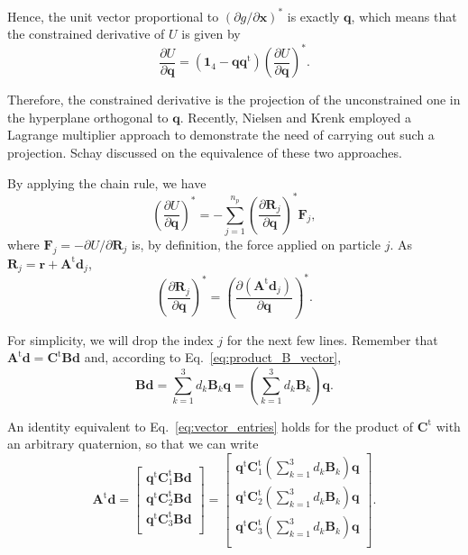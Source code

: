 \documentclass[aip,jcp,reprint,amsmath,amssymb]{revtex4-1}
\newcommand{\mt}[1]{\boldsymbol{\mathbf{#1}}}           %
\newcommand{\vt}[1]{\boldsymbol{\mathbf{#1}}}           %
\newcommand{\tr}[1]{#1^\text{t}}                               %
\newcommand{\diff}[2]{\dfrac{\partial #1}{\partial #2}} %
\begin{document}
Hence, the unit vector proportional to $(\partial g/\partial \vt x)^\ast$ is exactly $\vt q$, which means that the constrained derivative of $U$ is given by
\begin{equation}
\label{eq:diff_projection}
\diff{U}{\vt q} = (\mt 1_4 - {\vt q}\tr{\vt q})\left( \diff{U}{\vt q} \right)^\ast.
\end{equation}

Therefore, the constrained derivative is the projection of the unconstrained one in the hyperplane orthogonal to $\vt q$. Recently, Nielsen and Krenk\cite{Nielsen2012} employed a Lagrange multiplier approach to demonstrate the need of carrying out such a projection. Schay\cite{Schay1995, Schay1998} discussed on the equivalence of these two approaches.

By applying the chain rule, we have
\[
\left( \diff{U}{\vt q} \right)^\ast = - \sum_{j=1}^{n_p} \left( \diff{\vt R_j}{\vt q} \right)^\ast {\vt F_j},
\]
where $\vt F_j = -\partial U/\partial \vt R_j$ is, by definition, the force applied on particle $j$. As $\vt R_j = \vt r + \tr{\mt A}\vt d_j$,
\[
\left( \diff{\vt R_j}{\vt q} \right)^\ast = \left( \diff{(\tr{\mt A}\vt d_j)}{\vt q} \right)^\ast.
\]

For simplicity, we will drop the index $j$ for the next few lines. Remember that $\tr{\mt A}\vt d = \tr{\mt C} \mt B\vt d$ and, according to Eq.~\ref{eq:product_B_vector},
\[
\mt B \vt d = \sum_{k=1}^3 d_k \mt B_k \vt q = \left( \sum_{k=1}^3 d_k \mt B_k \right) \vt q.
\]

An identity equivalent to Eq.~\ref{eq:vector_entries} holds for the product of $\tr{\mt C}$ with an arbitrary quaternion, so that we can write
\[
\tr{\mt A}{\vt d} =
\left[\begin{array}{c}
\tr{\vt q}\tr{\mt C}_1 \mt B \vt d \\
\tr{\vt q}\tr{\mt C}_2 \mt B \vt d \\
\tr{\vt q}\tr{\mt C}_3 \mt B \vt d \\
\end{array}\right] = 
\left[\begin{array}{c}
\tr{\vt q} \tr{\mt C}_1 \left( \sum_{k=1}^3 d_k \mt B_k \right) \vt q \\
\tr{\vt q} \tr{\mt C}_2 \left( \sum_{k=1}^3 d_k \mt B_k \right) \vt q \\
\tr{\vt q} \tr{\mt C}_3 \left( \sum_{k=1}^3 d_k \mt B_k \right) \vt q \\
\end{array}\right].
\]
\end{document}
